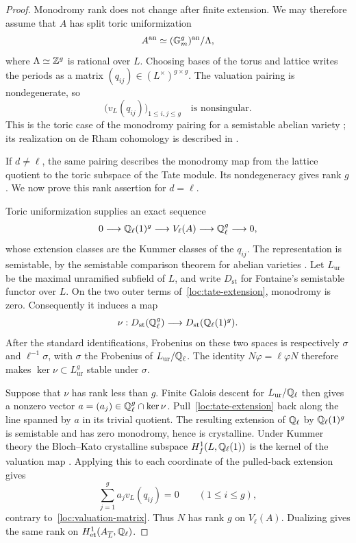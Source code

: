 \begin{proof}
Monodromy rank does not change after finite extension.  We may therefore
assume that $A$ has split toric uniformization
\[
 A^{\mathrm{an}}\simeq (\mathbb G_m^g)^{\mathrm{an}}/\Lambda,
\]
where $\Lambda\simeq\mathbb Z^g$ is rational over $L$.  Choosing bases of the
torus and lattice writes the periods as a matrix
$(q_{ij})\in(L^\times)^{g\times g}$.  The valuation pairing is
nondegenerate, so
\begin{equation}\label{loc:valuation-matrix}
 \bigl(v_L(q_{ij})\bigr)_{1\leq i,j\leq g}
 \quad\text{is nonsingular.}
\end{equation}
This is the toric case of the monodromy pairing for a semistable
abelian variety \cite[Expos\'e IX]{SGA7I}; its realization on de Rham
cohomology is described in \cite{ColemanIovita}.

If $d\ne\ell$, the same pairing describes the monodromy map from the
lattice quotient to the toric subspace of the Tate module.  Its
nondegeneracy gives rank $g$.  We now prove this rank assertion for
$d=\ell$.

Toric uniformization supplies an exact sequence
\begin{equation}\label{loc:tate-extension}
 0\longrightarrow\mathbb Q_\ell(1)^g\longrightarrow V_\ell(A)
   \longrightarrow\mathbb Q_\ell^g\longrightarrow0,
\end{equation}
whose extension classes are the Kummer classes of the $q_{ij}$.
The representation is semistable, by the semistable comparison theorem
for abelian varieties \cite{ColemanIovita}.  Let $L_{\mathrm{ur}}$ be the
maximal unramified subfield of $L$, and write
$D_{\mathrm{st}}$ for Fontaine's semistable functor over $L$.
On the two outer terms of~\eqref{loc:tate-extension}, monodromy is zero.
Consequently it induces a map
\[
 \nu:D_{\mathrm{st}}(\mathbb Q_\ell^g)
       \longrightarrow D_{\mathrm{st}}(\mathbb Q_\ell(1)^g).
\]
After the standard identifications, Frobenius on these two spaces is
respectively $\sigma$ and $\ell^{-1}\sigma$, with $\sigma$ the Frobenius
of $L_{\mathrm{ur}}/\mathbb Q_\ell$.  The identity $N\varphi=\ell\varphi N$
therefore makes $\ker\nu\subset L_{\mathrm{ur}}^g$ stable under $\sigma$.

Suppose that $\nu$ has rank less than $g$.  Finite Galois descent for
$L_{\mathrm{ur}}/\mathbb Q_\ell$ then gives a nonzero vector
$a=(a_j)\in\mathbb Q_\ell^g\cap\ker\nu$.
Pull~\eqref{loc:tate-extension} back along the line spanned by $a$ in
its trivial quotient.  The resulting extension of $\mathbb Q_\ell$ by
$\mathbb Q_\ell(1)^g$ is semistable and has zero monodromy, hence is crystalline.
Under Kummer theory the Bloch--Kato crystalline subspace
$H_f^1(L,\mathbb Q_\ell(1))$ is the kernel of the valuation map
\cite[Example~3.9]{BlochKato}.  Applying this to each coordinate of the
pulled-back extension gives
\[
 \sum_{j=1}^g a_jv_L(q_{ij})=0
 \qquad(1\leq i\leq g),
\]
contrary to~\eqref{loc:valuation-matrix}.
Thus $N$ has rank $g$ on $V_\ell(A)$.  Dualizing gives the same rank
on $H^1_{\mathrm{et}}(A_{\overline L},\mathbb Q_\ell)$.
\end{proof}

